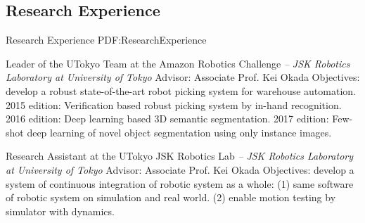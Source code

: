 \documentclass[letterpaper,MMMyyyy,nonstop]{simpleresumecv}
\begin{document}
\begin{body}
%
%


\section
{Research Experience}
{Research Experience}
{PDF:ResearchExperience}

Leader of the UTokyo Team at the Amazon Robotics Challenge
\hfill
\textit{ -- }
\newline
\textit{JSK Robotics Laboratory at University of Tokyo}
\newline
Advisor: Associate Prof. Kei Okada
\newline
Objectives: develop a robust state-of-the-art robot picking system for warehouse automation.
2015 edition: Verification based robust picking system by in-hand recognition.
2016 edition: Deep learning based 3D semantic segmentation.
2017 edition: Few-shot deep learning of novel object segmentation using only instance images.

\BigGapNoBreak

Research Assistant at the UTokyo JSK Robotics Lab
\hfill
\textit{ -- }
\newline
\textit{JSK Robotics Laboratory at University of Tokyo}
\newline
Advisor: Associate Prof. Kei Okada
\newline
Objectives: develop a system of continuous integration of robotic system as a whole:
(1) same software of robotic system on simulation and real world.
(2) enable motion testing by simulator with dynamics.


\end{body}
\end{document}
